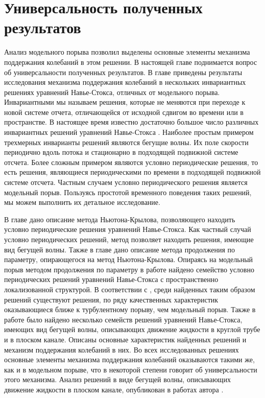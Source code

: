 
\chapter{Универсальность полученных результатов}

Анализ модельного порыва позволил выделены основные элементы механизма поддержания колебаний в этом решении. В настоящей главе поднимается вопрос об универсальности полученных результатов. В главе приведены результаты исследования механизма поддержания колебаний в нескольких инвариантных решениях уравнений Навье-Стокса, отличных от модельного порыва. Инвариантными мы называем решения, которые не меняются при переходе к новой системе отчета, отличающейся от исходной сдвигом во времени или в пространстве. В настоящее время известно достаточно большое число различных инвариантных решений уравнений Навье-Стокса \cite{Kawahara2012}. Наиболее простым примером трехмерных инварианты решений являются бегущие волны. Их поле скорости периодично вдоль потока и стационарно в подходящей подвижной системе отсчета. Более сложным примером являются условно периодические решения, то есть решения, являющиеся периодическими по времени в подходящей подвижной системе отсчета. Частным случаем условно периодического решения является модельный порыв. Пользуясь простотой временного поведения таких решений, мы можем выполнить их детальное исследование. 


В главе дано описание метода Ньютона-Крылова, позволяющего находить условно периодические решения уравнений Навье-Стокса. Как частный случай условно периодических решений, метод позволяет находить решения, имеющие вид бегущей волны. Также в главе дано описание метода продолжения по параметру, опирающегося на метод Ньютона-Крылова. Опираясь на модельный порыв методом продолжения по параметру в работе найдено семейство условно периодических решений уравнений Навье-Стокса с пространственно локализованной структурой. В соответствии с \cite{Avila2013}, среди найденных таким образом решений существуют решения, по ряду качественных характеристик оказывающиеся ближе к турбулентному порыву, чем модельный порыв.  Также в работе было найдено несколько семейств решений уравнений Навье-Стокса, имеющих вид бегущей волны, описывающих движение жидкости в круглой трубе и в плоском канале. Описаны основные характеристик найденных решений и механизм поддержания колебаний в них. Во всех исследованных решениях основные элементы механизма поддержания колебаний оказываются такими же, как и в модельном порыве, что в некоторой степени говорит об универсальности этого механизма. Анализ решений в виде бегущей волны, описывающих движение жидкости в плоском канале, опубликован в работах автора \cite{Vest18, KMU2016}. 


